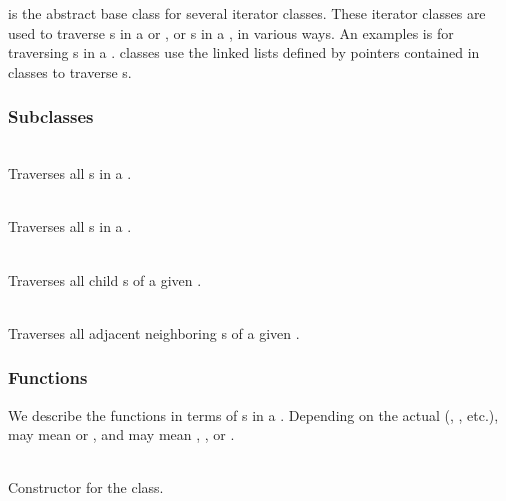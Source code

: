 \documentclass[11pt]{article}
\begin{document}
    is the abstract base class for several iterator
   classes.  These iterator classes are used to traverse s
   in a  or , or s in a
   , in various ways.  An examples is 
   for traversing s in a .  
   classes use the linked lists defined by pointers contained in
    classes to traverse s.

   \umlIterator

\subsubsection{ Subclasses}

     \\
     Traverses all s in a .

     \\
     Traverses all s in a .

     \\
     Traverses all child s of a given .

     \\
     Traverses all adjacent neighboring s of a given .

\subsubsection{ Functions}

    We describe the  functions in terms of
    s in a .  Depending on the actual
     (, , etc.),
     may mean  or , and
     may mean , , or
    .
    
     \\
    Constructor for the  class.
\end{document}
